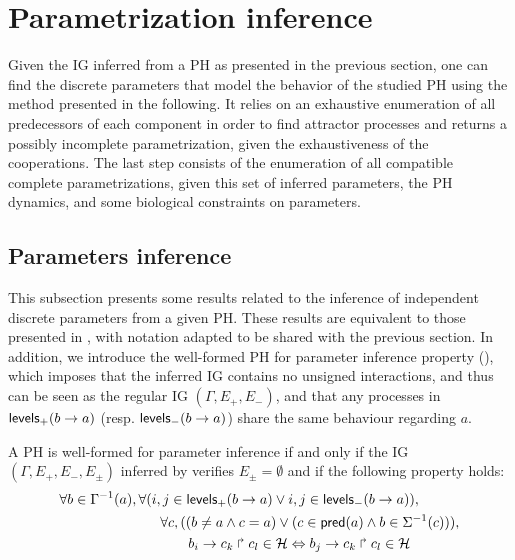 \section{Parametrization inference}\label{sec:infer-K}

Given the IG inferred from a PH as presented in the previous section, one can find the discrete parameters that model the behavior of the studied PH using the method presented in the following.
It relies on an exhaustive enumeration of all predecessors of each component in order to find attractor processes and returns a possibly incomplete parametrization, given the exhaustiveness of the cooperations.
The last step consists of the enumeration of all compatible complete parametrizations, given this
set of inferred parameters, the PH dynamics, and some biological constraints on parameters.

\subsection{Parameters inference}

This subsection presents some results related to the inference of independent discrete parameters from a given PH. These results are equivalent to those presented in \cite{PMR10-TCSB}, with notation adapted to be shared with the previous section.
In addition, we introduce the well-formed PH for parameter inference property (),
which imposes that the inferred IG contains no unsigned interactions, and thus can be seen as the
regular IG $(\Gamma, E_+, E_-)$,
and that any processes in $\mathsf{levels}_+(b\rightarrow a)$ (resp. $\mathsf{levels}_-(b\rightarrow a)$) share the same behaviour
regarding $a$.
\begin{property}\label{pro:wf-ph-K}
A PH is well-formed for parameter inference if and only if
the IG $(\Gamma, E_+, E_-, E_\pm)$ inferred by 
verifies $E_\pm=\emptyset$ and if the following property holds:
\begin{align}
\begin{split}
\forall b\in \Gamma^{-1}(a) &,
	\forall (i,j\in\mathsf{levels}_+(b\rightarrow a) \vee i,j\in\mathsf{levels}_-(b\rightarrow a)), \\
& \qquad	\forall c, ( (b\neq a\wedge c=a) \vee (c\in\mathsf{pred}(a) \wedge b\in\Sigma^{-1}(c))), \\
& \qquad \qquad
			b_i\rightarrow c_k\Rsh c_l\in\mathcal{H} \Leftrightarrow
				b_j\rightarrow c_k\Rsh c_l\in\mathcal{H}
\end{split}
\label{eq:wf-levels}
\end{align}
\end{property}


